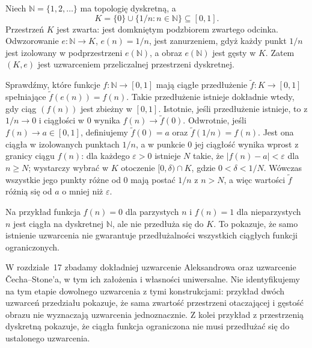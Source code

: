 \begin{przyklad}
\label{ex:topog-uzwarcenia-ciag-zbiezny}
Niech $\mathbb N=\{1,2,\ldots\}$
ma topologię dyskretną, a
\[
K=\{0\}\cup\{1/n:n\in\mathbb N\}
\subseteq[0,1].
\]
Przestrzeń $K$ jest zwarta:
jest domkniętym podzbiorem zwartego
odcinka. Odwzorowanie
$e\colon\mathbb N\to K$,
$e(n)=1/n$, jest zanurzeniem,
gdyż każdy punkt $1/n$ jest
izolowany w podprzestrzeni $e(\mathbb N)$,
a obraz $e(\mathbb N)$ jest gęsty w $K$.
Zatem $(K,e)$ jest uzwarceniem
przeliczalnej przestrzeni dyskretnej.

Sprawdźmy, które funkcje
$f\colon\mathbb N\to[0,1]$
mają ciągłe przedłużenie
$\widetilde f\colon K\to[0,1]$
spełniające $\widetilde f(e(n))=f(n)$.
Takie przedłużenie istnieje
dokładnie wtedy, gdy ciąg $(f(n))$
jest zbieżny w $[0,1]$.
Istotnie, jeśli przedłużenie istnieje,
to z $1/n\to0$ i ciągłości w $0$
wynika $f(n)\to\widetilde f(0)$.
Odwrotnie, jeśli $f(n)\to a\in[0,1]$,
definiujemy
$\widetilde f(0)=a$ oraz
$\widetilde f(1/n)=f(n)$.
Jest ona ciągła w izolowanych
punktach $1/n$, a w punkcie $0$
jej ciągłość wynika wprost
z granicy ciągu $f(n)$:
dla każdego $\varepsilon>0$
istnieje $N$ takie, że
$|f(n)-a|<\varepsilon$ dla $n\ge N$;
wystarczy wybrać w $K$
otoczenie $[0,\delta)\cap K$,
gdzie $0<\delta<1/N$.
Wówczas wszystkie jego punkty
różne od $0$ mają postać $1/n$
z $n>N$, a więc wartości
$\widetilde f$ różnią się od $a$
o mniej niż $\varepsilon$.

Na przykład funkcja $f(n)=0$
dla parzystych $n$ i $f(n)=1$
dla nieparzystych $n$ jest ciągła
na dyskretnej $\mathbb N$,
ale nie przedłuża się do $K$.
To pokazuje, że samo istnienie
uzwarcenia nie gwarantuje
przedłużalności wszystkich
ciągłych funkcji ograniczonych.
\end{przyklad}

\begin{uwaga}
W rozdziale~17 zbadamy dokładniej
uzwarcenie Aleksandrowa oraz
uzwarcenie Čecha--Stone'a, w tym ich
założenia i własności uniwersalne.
Nie identyfikujemy na tym etapie
dowolnego uzwarcenia z tymi konstrukcjami:
przykład dwóch uzwarceń przedziału
pokazuje, że sama zwartość przestrzeni
otaczającej i gęstość obrazu
nie wyznaczają uzwarcenia jednoznacznie.
Z kolei przykład z przestrzenią dyskretną
pokazuje, że ciągła funkcja ograniczona
nie musi przedłużać się do ustalonego
uzwarcenia.
\end{uwaga}
